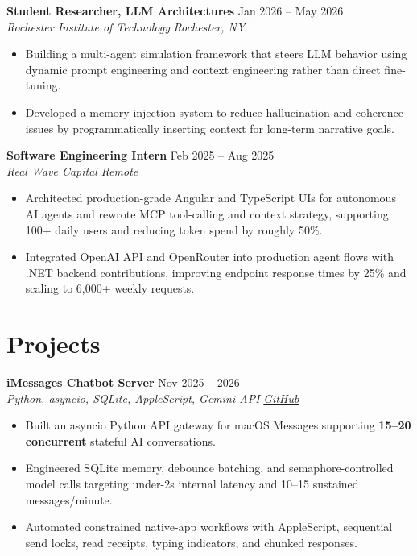 \documentclass[10pt,letterpaper]{article}
\newif\ifresumeFirstRole
\newcommand{\resumeRole}[4]{%
  \ifresumeFirstRole
    \global\resumeFirstRolefalse
  \else
    \vspace{0pt plus 1fill}%
  \fi
  \textbf{#1} \hfill #2\\
  \textit{#3} \hfill \textit{#4}
}
\begin{document}
\resumeRole{Student Researcher, LLM Architectures}{Jan 2026 -- May 2026}{Rochester Institute of Technology}{Rochester, NY}
\begin{itemize}
  \item Building a multi-agent simulation framework that steers LLM behavior using dynamic prompt engineering and context engineering rather than direct fine-tuning.
  \item Developed a memory injection system to reduce hallucination and coherence issues by programmatically inserting context for long-term narrative goals.
\end{itemize}

\resumeRole{Software Engineering Intern}{Feb 2025 -- Aug 2025}{Real Wave Capital}{Remote}
\begin{itemize}
  \item Architected production-grade Angular and TypeScript UIs for autonomous AI agents and rewrote MCP tool-calling and context strategy, supporting 100+ daily users and reducing token spend by roughly 50\%.
  \item Integrated OpenAI API and OpenRouter into production agent flows with .NET backend contributions, improving endpoint response times by 25\% and scaling to 6,000+ weekly requests.
\end{itemize}

\section*{Projects}
\resumeRole{iMessages Chatbot Server}{Nov 2025 -- 2026}{Python, asyncio, SQLite, AppleScript, Gemini API}{\href{https://github.com/alextyhwang/iMessages-Chatbot-Server}{GitHub}}
\begin{itemize}
  \item Built an asyncio Python API gateway for macOS Messages supporting \textbf{15--20 concurrent} stateful AI conversations.
  \item Engineered SQLite memory, debounce batching, and semaphore-controlled model calls targeting under-2s internal latency and 10--15 sustained messages/minute.
  \item Automated constrained native-app workflows with AppleScript, sequential send locks, read receipts, typing indicators, and chunked responses.
\end{itemize}
\end{document}
